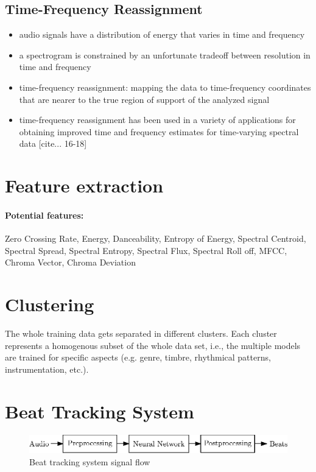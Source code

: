 \documentclass{article}
\begin{document}
\subsection{Time-Frequency Reassignment}
\begin{itemize}
\item audio signals have a distribution of energy that varies in time and frequency
\item a spectrogram is constrained by an unfortunate tradeoff between resolution in time and frequency
\item time-frequency reassignment: mapping the data to time-frequency coordinates that are nearer to the true region of support of the analyzed signal
\item time-frequency reassignment has been used in a variety of applications for obtaining improved time and frequency estimates for time-varying spectral data [cite... 16-18]
\end{itemize}


\section{Feature extraction}

\paragraph{Potential features:} Zero Crossing Rate, Energy, Danceability, Entropy of Energy, Spectral Centroid, Spectral Spread, Spectral Entropy, Spectral Flux, Spectral Roll off, MFCC, Chroma Vector, Chroma Deviation



\section{Clustering}
The whole training data gets separated in different clusters. Each cluster represents a homogenous subset of the whole data set, i.e., the multiple models are trained for specific aspects (e.g. genre, timbre, rhythmical patterns, instrumentation, etc.). 


\section{Beat Tracking System}

\begin{figure}[htbp]
\centering
\includegraphics[scale=1.0]{figures/beat_tracking_system.eps}
\caption{Beat tracking system signal flow}
\label{fig:}
\end{figure}	
\end{document}
